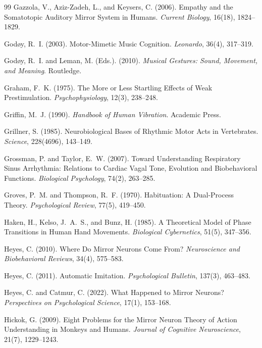\documentclass[11pt]{article}
\theoremstyle{plain}
\theoremstyle{definition}
\begin{document}
\begin{thebibliography}{99}
Gazzola, V., Aziz-Zadeh, L., and Keysers, C. (2006).
Empathy and the Somatotopic Auditory Mirror System in Humans.
\textit{Current Biology}, 16(18), 1824--1829.

God{\o}y, R.~I. (2003).
Motor-Mimetic Music Cognition.
\textit{Leonardo}, 36(4), 317--319.

God{\o}y, R.~I. and Leman, M. (Eds.). (2010).
\textit{Musical Gestures: Sound, Movement, and Meaning}.
Routledge.

Graham, F.~K. (1975).
The More or Less Startling Effects of Weak Prestimulation.
\textit{Psychophysiology}, 12(3), 238--248.

Griffin, M.~J. (1990).
\textit{Handbook of Human Vibration}.
Academic Press.

Grillner, S. (1985).
Neurobiological Bases of Rhythmic Motor Acts in Vertebrates.
\textit{Science}, 228(4696), 143--149.

Grossman, P. and Taylor, E.~W. (2007).
Toward Understanding Respiratory Sinus Arrhythmia: Relations to Cardiac Vagal Tone, Evolution and Biobehavioral Functions.
\textit{Biological Psychology}, 74(2), 263--285.

Groves, P.~M. and Thompson, R.~F. (1970).
Habituation: A Dual-Process Theory.
\textit{Psychological Review}, 77(5), 419--450.

Haken, H., Kelso, J.~A.~S., and Bunz, H. (1985).
A Theoretical Model of Phase Transitions in Human Hand Movements.
\textit{Biological Cybernetics}, 51(5), 347--356.

Heyes, C. (2010).
Where Do Mirror Neurons Come From?
\textit{Neuroscience and Biobehavioral Reviews}, 34(4), 575--583.

Heyes, C. (2011).
Automatic Imitation.
\textit{Psychological Bulletin}, 137(3), 463--483.

Heyes, C. and Catmur, C. (2022).
What Happened to Mirror Neurons?
\textit{Perspectives on Psychological Science}, 17(1), 153--168.

Hickok, G. (2009).
Eight Problems for the Mirror Neuron Theory of Action Understanding in Monkeys and Humans.
\textit{Journal of Cognitive Neuroscience}, 21(7), 1229--1243.


\end{thebibliography}
\end{document}
